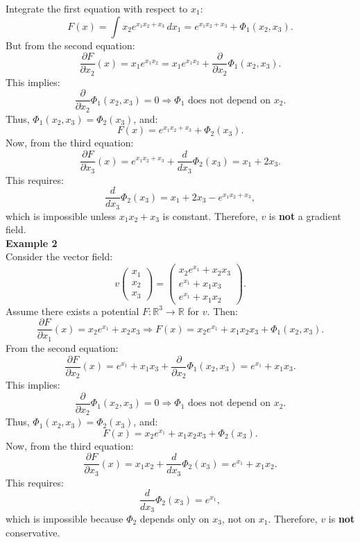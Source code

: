 \documentclass{article}
\begin{document}
Integrate the first equation with respect to \( x_1 \):
\[
F(x) = \int x_2 e^{x_1 x_2 + x_3} \, dx_1 = e^{x_1 x_2 + x_3} + \Phi_1(x_2, x_3).
\]
But from the second equation:
\[
\frac{\partial F}{\partial x_2}(x) = x_1 e^{x_1 x_2} = x_1 e^{x_1 x_2} + \frac{\partial}{\partial x_2} \Phi_1(x_2, x_3).
\]
This implies:
\[
\frac{\partial}{\partial x_2} \Phi_1(x_2, x_3) = 0 \Rightarrow \Phi_1 \text{ does not depend on } x_2.
\]
Thus, \( \Phi_1(x_2, x_3) = \Phi_2(x_3) \), and:
\[
F(x) = e^{x_1 x_2 + x_3} + \Phi_2(x_3).
\]
Now, from the third equation:
\[
\frac{\partial F}{\partial x_3}(x) = e^{x_1 x_2 + x_3} + \frac{d}{dx_3} \Phi_2(x_3) = x_1 + 2 x_3.
\]
This requires:
\[
\frac{d}{dx_3} \Phi_2(x_3) = x_1 + 2 x_3 - e^{x_1 x_2 + x_3},
\]
which is impossible unless \( x_1 x_2 + x_3 \) is constant. Therefore, \( v \) is \textbf{not} a gradient field.
\\
\textbf{Example 2}\\
Consider the vector field:
\[
v \begin{pmatrix} x_1 \\ x_2 \\ x_3 \end{pmatrix} = 
\begin{pmatrix}
x_2 e^{x_1} + x_2 x_3 \\
e^{x_1} + x_1 x_3 \\
e^{x_1} + x_1 x_2
\end{pmatrix}.
\]
Assume there exists a potential \( F: \mathbb{R}^3 \rightarrow \mathbb{R} \) for \( v \). Then:
\[
\frac{\partial F}{\partial x_1}(x) = x_2 e^{x_1} + x_2 x_3 \Rightarrow F(x) = x_2 e^{x_1} + x_1 x_2 x_3 + \Phi_1(x_2, x_3).
\]
From the second equation:
\[
\frac{\partial F}{\partial x_2}(x) = e^{x_1} + x_1 x_3 + \frac{\partial}{\partial x_2} \Phi_1(x_2, x_3) = e^{x_1} + x_1 x_3.
\]
This implies:
\[
\frac{\partial}{\partial x_2} \Phi_1(x_2, x_3) = 0 \Rightarrow \Phi_1 \text{ does not depend on } x_2.
\]
Thus, \( \Phi_1(x_2, x_3) = \Phi_2(x_3) \), and:
\[
F(x) = x_2 e^{x_1} + x_1 x_2 x_3 + \Phi_2(x_3).
\]
Now, from the third equation:
\[
\frac{\partial F}{\partial x_3}(x) = x_1 x_2 + \frac{d}{dx_3} \Phi_2(x_3) = e^{x_1} + x_1 x_2.
\]
This requires:
\[
\frac{d}{dx_3} \Phi_2(x_3) = e^{x_1},
\]
which is impossible because \( \Phi_2 \) depends only on \( x_3 \), not on \( x_1 \). Therefore, \( v \) is \textbf{not} conservative.
\end{document}
